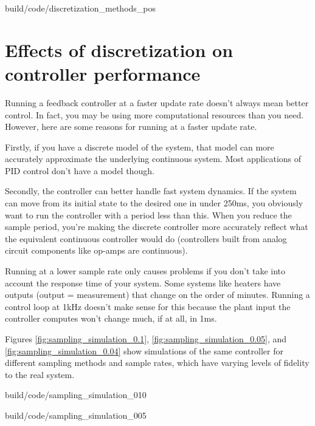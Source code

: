 \begin{svg}{build/code/discretization_methods_pos}
  \caption{Position plot of discretization methods applied to velocity data}
  \label{fig:discretization_methods_pos}
\end{svg}

\section{Effects of discretization on controller performance}

Running a feedback controller at a faster update rate doesn't always mean better
control. In fact, you may be using more computational resources than you need.
However, here are some reasons for running at a faster update rate.

Firstly, if you have a discrete model of the system, that model can more
accurately approximate the underlying continuous system. Most applications of
PID control don't have a model though.

Secondly, the controller can better handle fast system dynamics. If the system
can move from its initial state to the desired one in under 250ms, you obviously
want to run the controller with a period less than this. When you reduce the
sample period, you're making the discrete controller more accurately reflect
what the equivalent continuous controller would do (controllers built from
analog circuit components like op-amps are continuous).

Running at a lower sample rate only causes problems if you don't take into
account the response time of your system. Some systems like heaters have outputs
(output = measurement) that change on the order of minutes. Running a control
loop at 1kHz doesn't make sense for this because the plant input the controller
computes won't change much, if at all, in 1ms.

Figures \ref{fig:sampling_simulation_0.1}, \ref{fig:sampling_simulation_0.05},
and \ref{fig:sampling_simulation_0.04} show simulations of the same controller
for different sampling methods and sample rates, which have varying levels of
fidelity to the real system.

\begin{svg}{build/code/sampling_simulation_010}
  \caption{Sampling methods for system simulation with $T = 0.1s$}
  \label{fig:sampling_simulation_0.1}
\end{svg}

\begin{svg}{build/code/sampling_simulation_005}
  \caption{Sampling methods for system simulation with $T = 0.05s$}
  \label{fig:sampling_simulation_0.05}
\end{svg}

